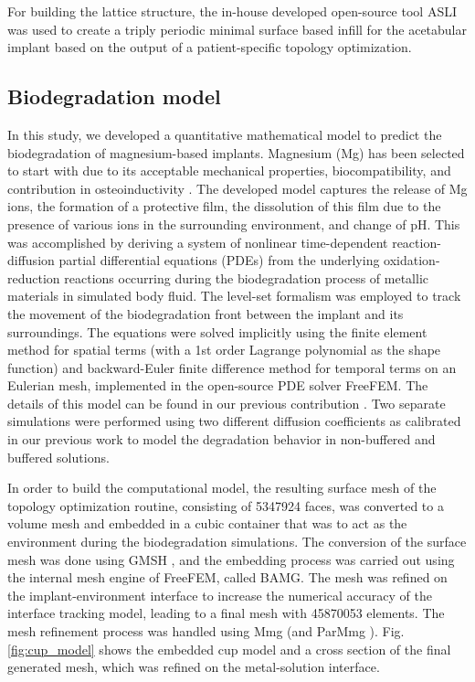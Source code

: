 For building the lattice structure, the in-house developed open-source tool ASLI \cite{Perez-Boerema2022} was used to create a triply periodic minimal surface based infill for the acetabular implant based on the output of a patient-specific topology optimization.

\subsection{Biodegradation model}




In this study, we developed a quantitative mathematical model to predict the biodegradation of magnesium-based implants. Magnesium (Mg) has been selected to start with due to its acceptable mechanical properties, biocompatibility, and contribution in osteoinductivity \cite{Agarwal2016}. The developed model captures the release of Mg ions, the formation of a protective film,  the dissolution of this film due to the presence of various ions in the surrounding environment, and change of pH. This was accomplished by deriving a system of nonlinear time-dependent reaction-diffusion partial differential equations (PDEs) from the underlying oxidation-reduction reactions occurring during the biodegradation process of metallic materials in simulated body fluid. The level-set formalism was employed to track the movement of the biodegradation front between the implant and its surroundings. The equations were solved implicitly using the finite element method for spatial terms (with a 1st order Lagrange polynomial as the shape function) and backward-Euler finite difference method for temporal terms on an Eulerian mesh, implemented in the open-source PDE solver FreeFEM\cite{Hecht2012}. The details of this model can be found in our previous contribution \cite{Barzegari2021}. Two separate simulations were performed using two different diffusion coefficients as calibrated in our previous work to model the degradation behavior in non-buffered and buffered solutions.

In order to build the computational model, the resulting surface mesh of the topology optimization routine, consisting of \num{5347924} faces, was converted to a volume mesh and embedded in a cubic container that was to act as the environment during the biodegradation simulations. The conversion of the surface mesh was done using GMSH \cite{Geuzaine2009}, and the embedding process was carried out using the internal mesh engine of FreeFEM, called BAMG. The mesh was refined on the implant-environment interface to increase the numerical accuracy of the interface tracking model, leading to a final mesh with \num{45870053} elements. The mesh refinement process was handled using Mmg \cite{Dapogny2014} (and ParMmg \cite{balarac:hal-03344779}). Fig. \ref{fig:cup_model} shows the embedded cup model and a cross section of the final generated mesh, which was refined on the metal-solution interface.



